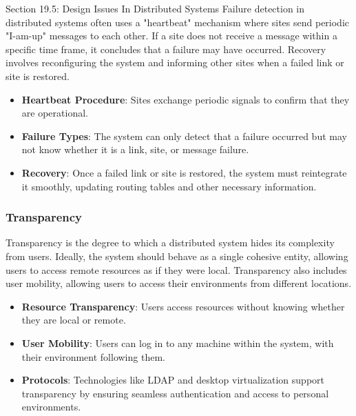 \begin{notes}{Section 19.5: Design Issues In Distributed Systems}
    Failure detection in distributed systems often uses a "heartbeat" mechanism where sites send periodic "I-am-up" messages to each other. If a site does not receive a message within a specific time 
    frame, it concludes that a failure may have occurred. Recovery involves reconfiguring the system and informing other sites when a failed link or site is restored.
    
    \begin{highlight}
    
        \begin{itemize}
            \item \textbf{Heartbeat Procedure}: Sites exchange periodic signals to confirm that they are operational.
            \item \textbf{Failure Types}: The system can only detect that a failure occurred but may not know whether it is a link, site, or message failure.
            \item \textbf{Recovery}: Once a failed link or site is restored, the system must reintegrate it smoothly, updating routing tables and other necessary information.
        \end{itemize}
    
    \end{highlight}
    
    \subsubsection*{Transparency}
    
    Transparency is the degree to which a distributed system hides its complexity from users. Ideally, the system should behave as a single cohesive entity, allowing users to access remote resources 
    as if they were local. Transparency also includes user mobility, allowing users to access their environments from different locations.
    
    \begin{highlight}[Transparency]
    
        \begin{itemize}
            \item \textbf{Resource Transparency}: Users access resources without knowing whether they are local or remote.
            \item \textbf{User Mobility}: Users can log in to any machine within the system, with their environment following them.
            \item \textbf{Protocols}: Technologies like LDAP and desktop virtualization support transparency by ensuring seamless authentication and access to personal environments.
        \end{itemize}
    

\end{highlight}
\end{notes}
